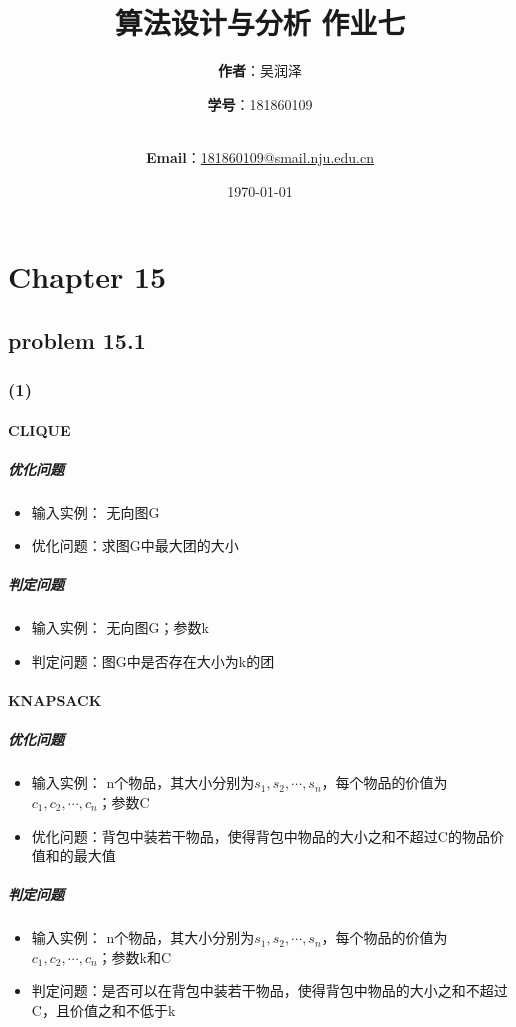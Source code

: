 \documentclass[11pt,a4paper,oneside,oldfontcommands]{ctexart}
\title{\Huge\textbf{算法设计与分析 作业七}\\}
\author{\Large\textbf{作者}：吴润泽 \and{\Large\textbf{学号}：181860109}\\
	\\
	\and {\Large\textbf{Email}：\href{mailto:181860109@smail.nju.edu.cn}{181860109@smail.nju.edu.cn}}\\}
\date{\Large\today}
\begin{document}
\maketitle

\tableofcontents
\cleardoublepage
\section*{Chapter 15}
{\subsection*{problem 15.1}}
\subsubsection*{(1)}
\paragraph*{CLIQUE}
\subparagraph*{优化问题}
\begin{itemize}
	\item {输入实例： 无向图G}
	\item {优化问题：求图G中最大团的大小}
\end{itemize}
\subparagraph*{判定问题}
\begin{itemize}
	\item {输入实例： 无向图G；参数k}
	\item {判定问题：图G中是否存在大小为k的团}
\end{itemize}
\paragraph*{KNAPSACK}
\subparagraph*{优化问题}
\begin{itemize}
	\item {输入实例： n个物品，其大小分别为$s_1,s_2,\cdots,s_n$，每个物品的价值为$c_1,c_2,\cdots,c_n$；参数C}
	\item {优化问题：背包中装若干物品，使得背包中物品的大小之和不超过C的物品价值和的最大值}
\end{itemize}
\subparagraph*{判定问题}
\begin{itemize}
	\item {输入实例： n个物品，其大小分别为$s_1,s_2,\cdots,s_n$，每个物品的价值为$c_1,c_2,\cdots,c_n$；参数k和C}
	\item {判定问题：是否可以在背包中装若干物品，使得背包中物品的大小之和不超过C，且价值之和不低于k}
\end{itemize}
\end{document}
